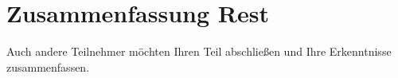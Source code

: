 \section{Zusammenfassung Rest}

Auch andere Teilnehmer möchten Ihren Teil abschließen und Ihre Erkenntnisse zusammenfassen.
